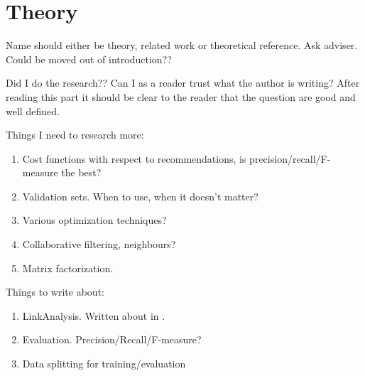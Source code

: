 

\section{Theory}\label{sec:intro:theory}

Name should either be theory, related work or theoretical reference. Ask adviser. Could be moved out of introduction??

Did I do the research?? Can I as a reader trust what the author is writing? After reading this part it should be clear to the reader that the question are good and well defined.

Things I need to research more:

\begin{enumerate}
    \item Cost functions with respect to recommendations, is precision/recall/F-measure the best?
    \item Validation sets. When to use, when it doesn't matter?
    \item Various optimization techniques?
    \item Collaborative filtering, neighbours? \cite{Yifan:2008}
    \item Matrix factorization.
\end{enumerate}

Things to write about:

\begin{enumerate}
    \item LinkAnalysis. Written about in \cite{Zan:2007}.
    \item Evaluation. Precision/Recall/F-measure?
    \item Data splitting for training/evaluation
\end{enumerate}
